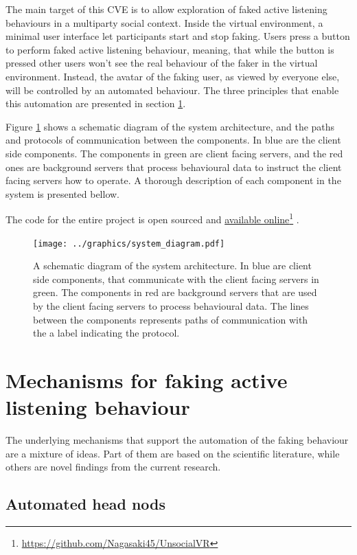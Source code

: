 \documentclass[]{simple-thesis}
\newcommand\fnurl[2]{%
  \href{#2}{#1}\footnote{\url{#2}}%
}
\begin{document}
The main target of this CVE is to allow exploration of faked active listening behaviours in a multiparty social context.
Inside the virtual environment, a minimal user interface let participants start and stop faking.
Users press a button to perform faked active listening behaviour, meaning, that while the button is pressed other users won't see the real behaviour of the faker in the virtual environment.
Instead, the avatar of the faking user, as viewed by everyone else, will be controlled by an automated behaviour.
The three principles that enable this automation are presented in section \ref{system:mechanisms}.

Figure \ref{fig:system:diagram} shows a schematic diagram of the system architecture, and the paths and protocols of communication between the components.
In blue are the client side components.
The components in green are client facing servers, and the red ones are background servers that process behavioural data to instruct the client facing servers how to operate.
A thorough description of each component in the system is presented bellow.

The code for the entire project is open sourced and \fnurl{available online}{https://github.com/Nagasaki45/UnsocialVR}.

\begin{figure}
  \texttt{[image: ../graphics/system\_diagram.pdf]}
  \caption{A schematic diagram of the system architecture. In blue are client side components, that communicate with the client facing servers in green. The components in red are background servers that are used by the client facing servers to process behavioural data. The lines between the components represents paths of communication with the a label indicating the protocol.}
  \label{fig:system:diagram}
\end{figure}

\section{Mechanisms for faking active listening behaviour}\label{system:mechanisms}

The underlying mechanisms that support the automation of the faking behaviour are a mixture of ideas.
Part of them are based on the scientific literature, while others are novel findings from the current research.

\subsection{Automated head nods}
\end{document}

